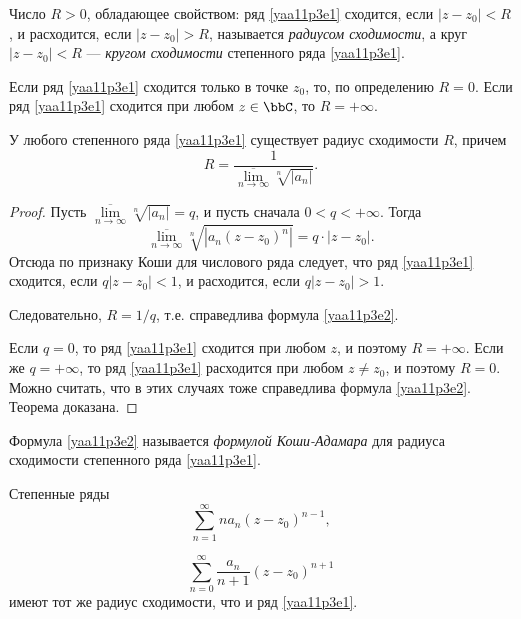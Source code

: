 \begin{defn}
Число $R>0$, обладающее свойством: ряд \eqref{yaa11p3e1} сходится, если $|z-z_0|<R$, и расходится, если $|z-z_0|>R$, называется \textit{радиусом сходимости}, а круг $|z-z_0|<R$ --- \textit{кругом сходимости} степенного ряда \eqref{yaa11p3e1}.

Если ряд \eqref{yaa11p3e1} сходится только в точке $z_0$, то, по определению $R=0$. Если ряд \eqref{yaa11p3e1} сходится при любом $z\in\bbC$, то $R=+\infty$.
\end{defn}

\begin{thm}
У любого степенного ряда \eqref{yaa11p3e1} существует радиус сходимости $R$, причем
\begin{equation}\label{yaa11p3e2}
R=\frac{1}{\overline{\lim\limits_{n\to\infty}}\sqrt[n]{|a_n|}}.
\end{equation} 
\end{thm}

\begin{proof}
Пусть $\overline{\lim\limits_{n\to\infty}}\sqrt[n]{|a_n|}=q$, и пусть сначала $0<q<+\infty$. Тогда
$$
\overline{\lim\limits_{n\to\infty}}\sqrt[n]{|a_n(z-z_0)^n|}=q\cdot |z-z_0|.
$$
Отсюда по признаку Коши для числового ряда следует, что ряд \eqref{yaa11p3e1} сходится, если $q|z-z_0|<1$, и расходится, если $q|z-z_0|>1$.

Следовательно, $R=1/q$, т.е. справедлива формула \eqref{yaa11p3e2}.

Если $q=0$, то ряд \eqref{yaa11p3e1} сходится при любом $z$, и поэтому $R=+\infty$. Если же $q=+\infty$, то ряд \eqref{yaa11p3e1} расходится при любом $z\ne z_0$, и поэтому $R=0$. Можно считать, что в этих случаях тоже справедлива формула \eqref{yaa11p3e2}. Теорема доказана.
\end{proof}

Формула \eqref{yaa11p3e2} называется \textit{формулой Коши-Адамара} для радиуса сходимости степенного ряда \eqref{yaa11p3e1}.

\begin{thm} \label{yaa11p3thm3}
Степенные ряды
\begin{equation}\label{yaa11p3e5}
\sum\limits_{n=1}^{\infty} na_n(z-z_0)^{n-1},
\end{equation}

\begin{equation}\label{yaa11p3e6}
\sum\limits_{n=0}^{\infty}\frac{a_n}{n+1}(z-z_0)^{n+1}
\end{equation}
имеют тот же радиус сходимости, что и ряд \eqref{yaa11p3e1}.
\end{thm}


